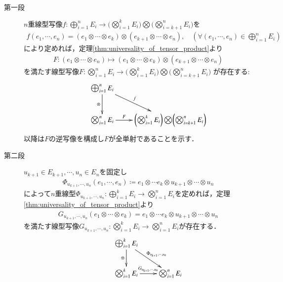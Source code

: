 	\begin{prf}\mbox{}
		\begin{description}
			\item[第一段]
				$n$重線型写像$f:\bigoplus_{i=1}^n E_i \longrightarrow \biggl( \bigotimes_{i=1}^k E_i \biggr) \bigotimes \biggl( \bigotimes_{i=k+1}^n E_i \biggr)$を
				\begin{align}
					f(e_1,\cdots,e_n) = (e_1 \otimes \cdots \otimes e_k) \otimes 
					(e_{k+1} \otimes \cdots \otimes e_n),
					\quad (\forall (e_1,\cdots,e_n) \in \bigoplus_{i=1}^n E_i)
				\end{align}
				により定めれば，定理\ref{thm:universality_of_tensor_product}より
				\begin{align}
					F:(e_1 \otimes \cdots \otimes e_n)
					\longmapsto (e_1 \otimes \cdots \otimes e_k) \otimes 
					(e_{k+1} \otimes \cdots \otimes e_n)
				\end{align}
				を満たす線型写像$F:\bigotimes_{i=1}^n E_i \longrightarrow \biggl( \bigotimes_{i=1}^k E_i \biggr) \bigotimes \biggl( \bigotimes_{i=k+1}^n E_i \biggr)$
				が存在する:
				\begin{align}
					\xymatrix{
						&\bigoplus_{i=1}^n E_i \ar[d]_-\otimes \ar[rd]^-f & \\
						&\bigotimes_{i=1}^n E_i \ar[r]^-F & \biggl( \bigotimes_{i=1}^k E_i \biggr) \bigotimes \biggl( \bigotimes_{i=k+1}^n E_i \biggr)
					}
				\end{align}
				以降は$F$の逆写像を構成し$F$が全単射であることを示す．
				
			\item[第二段]
				$u_{k+1} \in E_{k+1},\cdots,u_n \in E_n$を固定し
				\begin{align}
					\Phi_{u_{k+1},\cdots,u_n}(e_1,\cdots,e_n)
					\coloneqq e_1 \otimes \cdots e_k \otimes u_{k+1} \otimes \cdots \otimes u_n
				\end{align}
				によって$n$重線型$\Phi_{u_{k+1},\cdots,u_n}:\bigoplus_{i=1}^k E_i \longrightarrow 
				\bigotimes_{i=1}^n E_i$を定めれば，定理\ref{thm:universality_of_tensor_product}より
				\begin{align}
					G_{u_{k+1},\cdots,u_n}(e_1 \otimes \cdots \otimes e_k)
					= e_1 \otimes \cdots e_k \otimes u_{k+1} \otimes \cdots \otimes u_n
				\end{align}
				を満たす線型写像$G_{u_{k+1},\cdots,u_n}:\bigotimes_{i=1}^k E_i \longrightarrow 
				\bigotimes_{i=1}^n E_i$が存在する．
				\begin{align}
					\xymatrix{
						&\bigoplus_{i=1}^k E_i \ar[d]_-\otimes \ar[rd]^-{\Phi_{u_{k+1},\cdots,u_n}} & \\
						&\bigotimes_{i=1}^k E_i \ar[r]^-{G_{u_{k+1},\cdots,u_n}} & \bigotimes_{i=1}^n E_i
					}
				\end{align}
			

\end{description}
\end{prf}

